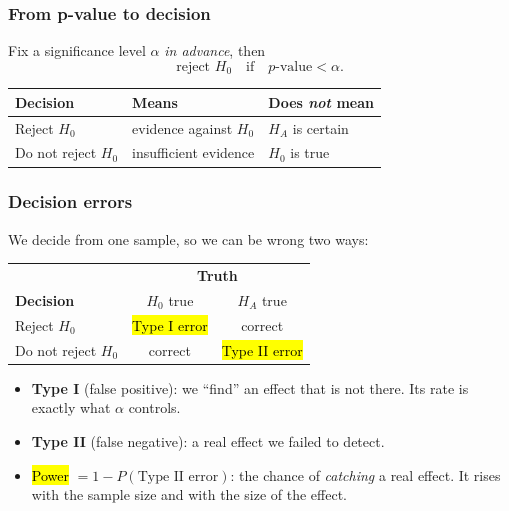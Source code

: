 \documentclass[slidestop,compress,mathserif]{beamer}
\begin{document}
\begin{frame}
\frametitle{From p-value to decision}

Fix a significance level $\alpha$ \emph{in advance}, then
\[
\text{reject } H_0 \quad\text{if}\quad p\text{-value} < \alpha .
\]
\vspace{0.3em}
{\small
\begin{center}
\begin{tabular}{lll}
\toprule
Decision & Means & Does \emph{not} mean \\
\midrule
Reject $H_0$ & evidence against $H_0$ & $H_A$ is certain \\
Do not reject $H_0$ & insufficient evidence & $H_0$ is true \\
\bottomrule
\end{tabular}
\end{center}}

\vspace{0.4em}

\end{frame}
\begin{frame}
\frametitle{Decision errors}

We decide from one sample, so we can be wrong two ways:

\begin{center}
\begin{tabular}{l|cc}
& \multicolumn{2}{c}{\textbf{Truth}} \\
\textbf{Decision} & $H_0$ true & $H_A$ true \\
\hline
Reject $H_0$ & \hl{Type I error} & correct \\
Do not reject $H_0$ & correct & \hl{Type II error} \\
\end{tabular}
\end{center}

\vspace{0.5em}
\begin{itemize}
\item \textbf{Type I} (false positive): we ``find'' an effect that is not there. Its rate is exactly what $\alpha$ controls.
\item \textbf{Type II} (false negative): a real effect we failed to detect.
\item \hl{Power} $=1-P(\text{Type II error})$: the chance of \emph{catching} a real effect. It rises with the sample size and with the size of the effect.
\end{itemize}

\end{frame}
\end{document}
